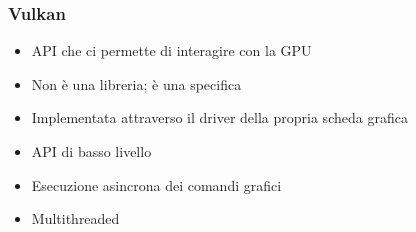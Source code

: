 \begin{frame}
\frametitle{Vulkan}

\begin{itemize}
\item API che ci permette di interagire con la GPU
\item Non è una libreria; è una specifica
\item Implementata attraverso il driver della propria scheda grafica
\item API di basso livello
\item Esecuzione asincrona dei comandi grafici
\item Multithreaded
\end{itemize}

\end{frame}
